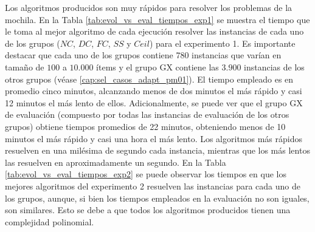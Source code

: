 Los algoritmos producidos son muy rápidos para resolver los problemas de la mochila. En la Tabla \ref{tab:evol_vs_eval_tiempos_exp1} se muestra el tiempo que le toma al mejor algoritmo de cada ejecución resolver las instancias de cada uno de los grupos ($NC$, $DC$, $FC$, $SS$ y $Ceil$) para el experimento 1. Es importante destacar que cada uno de los grupos contiene 780 instancias que varían en tamaño de $100$ a $10.000$ ítems y el grupo GX contiene las $3.900$ instancias de los otros grupos (véase \ref{cap:sel_casos_adapt_pm01}). El tiempo empleado es en promedio cinco minutos, alcanzando menos de dos minutos el más rápido y casi 12 minutos el más lento de ellos. Adicionalmente, se puede ver que el grupo GX de evaluación (compuesto por todas las instancias de evaluación de los otros grupos) obtiene tiempos promedios de 22 minutos, obteniendo menos de 10 minutos el más rápido y casi una hora el más lento. Los algoritmos más rápidos resuelven en una milésima de segundo cada instancia, mientras que los más lentos las resuelven en aproximadamente un segundo. En la Tabla \ref{tab:evol_vs_eval_tiempos_exp2} se puede observar los tiempos en que los mejores algoritmos del experimento 2 resuelven las instancias para cada uno de los grupos, aunque, si bien los tiempos empleados en la evaluación no son iguales, son similares. Esto se debe a que todos los algoritmos producidos tienen una complejidad polinomial. %

